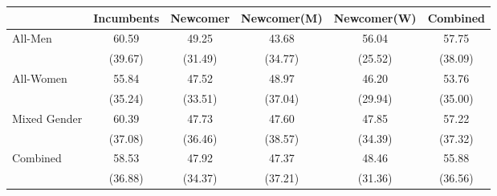 \begin{tabular}{l*{5}{c}}
\toprule
                & Incumbents & Newcomer & Newcomer(M) & Newcomer(W) &    Combined \\
\midrule
All-Men      & 60.59 & 49.25  &    43.68&    56.04&    57.75\\
                &(39.67)&(31.49)&  (34.77)&  (25.52)&  (38.09)\\
\addlinespace
All-Women &   55.84&   47.52 &    48.97&    46.20&    53.76\\
                &  (35.24)& (33.51)&  (37.04)&  (29.94)&  (35.00)\\
\addlinespace
Mixed Gender     &     60.39&    47.73&    47.60&    47.85&    57.22\\
                &     (37.08)&   (36.46)&  (38.57)&  (34.39)&  (37.32)\\
\addlinespace
Combined &    58.53 &  47.92&    47.37&    48.46&    55.88\\
                &  (36.88)&  (34.37)&  (37.21)&  (31.36)&  (36.56)\\

\bottomrule
\end{tabular}
